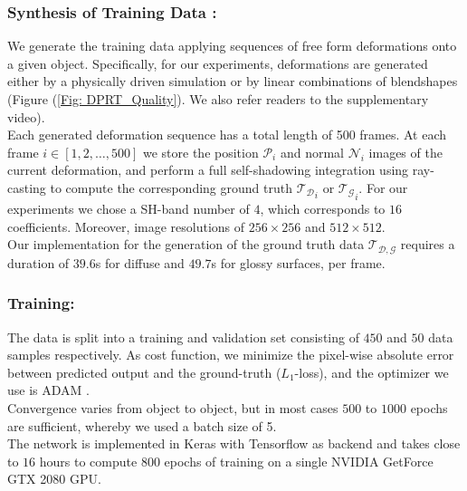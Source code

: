 \subsubsection*{Synthesis of Training Data :\\}
We generate the training data applying sequences of free form deformations onto a given object. Specifically, for our experiments, deformations are generated either by a physically driven simulation or by linear combinations of blendshapes (Figure (\ref{Fig: DPRT_Quality}). We also refer readers to the supplementary video). 
\\
Each generated deformation sequence has a total length of 500 frames. 
At each frame $i \in [1,2,\dots,500]$ we store the position $\mathcal{P}_i$  and normal $\mathcal{N}_i$ images of the current deformation, and perform a full self-shadowing integration using ray-casting to compute the corresponding ground truth $\mathcal{T_D}_i$ or $\mathcal{T_G}_i$. For our experiments we chose a SH-band number of $4$, which corresponds to $16$ coefficients. Moreover, image resolutions of $256 \times 256$ and $512 \times 512$. 
\\
Our implementation for the generation of the ground truth data $\mathcal{T_{D,G}}$ requires a duration of $39.6$s for diffuse and $49.7$s for glossy surfaces, per frame.

\subsubsection*{Training: \\} 
The data is split into a training and validation set consisting of $450$ and $50$ data samples respectively. As cost function, we minimize the pixel-wise absolute error between predicted output and the ground-truth ($L_1$-loss), and the optimizer we use is ADAM \cite{ADAM}. 
\\
Convergence varies from object to object, but in most cases $500$ to $1000$ epochs are sufficient, whereby we used a batch size of 5. \\
The network is implemented in Keras with Tensorflow as backend \cite{Keras} and takes close to $16$ hours to compute $800$ epochs of training on a single NVIDIA GetForce GTX 2080 GPU.

